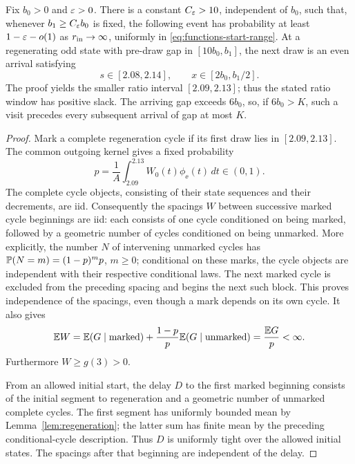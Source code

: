 \begin{lemma}\label{lem:marked-visits}
Fix \(b_0>0\) and \(\varepsilon>0\).  There is a constant
\(C_\varepsilon>10\), independent of \(b_0\), such that, whenever
\(b_1\ge C_\varepsilon b_0\) is fixed, the following event has
probability at least \(1-\varepsilon-o(1)\) as \(r_{\rm in}\to\infty\),
uniformly in \eqref{eq:functions-start-range}.
At a regenerating odd state with pre-draw gap in
\([10b_0,b_1]\), the next draw is an even arrival satisfying
\[
 s\in[2.08,2.14],\qquad x\in[2b_0,b_1/2].
\]
The proof yields the smaller ratio interval \([2.09,2.13]\);
thus the stated ratio window has positive slack.
The arriving gap exceeds \(6b_0\), so, if \(6b_0>K\), such a visit
precedes every subsequent arrival of gap at most \(K\).
\end{lemma}

\begin{proof}
Mark a complete regeneration cycle if its first draw lies in
\([2.09,2.13]\).  The common outgoing kernel gives a fixed
probability
\[
 p=\frac1A\int_{2.09}^{2.13}W_0(t)\phi_\ee(t)\,dt
 \in(0,1).
\]
The complete cycle objects, consisting of their state sequences
and their decrements, are iid.
Consequently the spacings \(W\) between successive marked cycle
beginnings are iid: each consists of one cycle conditioned on
being marked, followed by a geometric number of cycles conditioned
on being unmarked.  More explicitly, the number \(N\) of intervening
unmarked cycles has
\(\mathbb P(N=m)=(1-p)^m p\), \(m\ge0\); conditional on these marks,
the cycle objects are independent with their respective
conditional laws.
The next marked cycle is excluded from the preceding spacing
and begins the next such block.  This proves independence of
the spacings, even though a mark depends on its own cycle.
It also gives
\[
 \mathbb E W=
 \mathbb E(G\mid\text{marked})
 +\frac{1-p}{p}\mathbb E(G\mid\text{unmarked})
 =\frac{\mathbb E G}{p}<\infty.
\]
Furthermore \(W\ge g(3)>0\).

From an allowed initial start, the delay \(D\) to the first
marked beginning consists of the initial segment to regeneration
and a geometric number of unmarked complete cycles.
The first segment has uniformly bounded mean by
Lemma~\ref{lem:regeneration}; the latter sum has finite mean by
the preceding conditional-cycle description.
Thus \(D\) is uniformly tight over the allowed initial states.
The spacings after that beginning are independent of the delay.


\end{proof}
